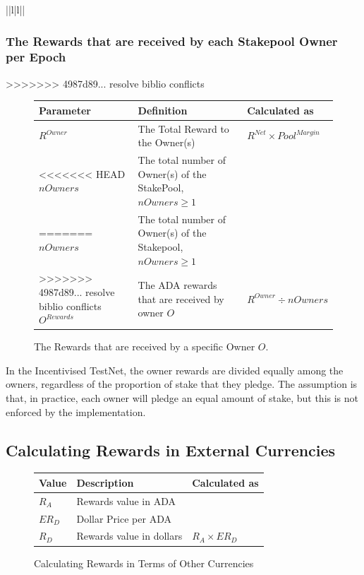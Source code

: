 \documentclass[11pt,a4paper,dvipsnames,twosided,final]{article}
\newcommand{\ada}{ADA{}}
\begin{document}
\begin{tabular}{||l|l||}
\clearpage
\subsubsection*{The Rewards that are received by each Stakepool Owner per Epoch}
>>>>>>> 4987d89... resolve biblio conflicts

\begin{figure}[h!]
\begin{center}
\begin{tabular}{||l|p{6cm}|l||}
  \hline \hline
\textbf{Parameter}  & \textbf{Definition} & \textbf{Calculated as} \\\hline
$R^\textit{Owner}$ & The Total Reward to the Owner(s) & $R^{\textit{Net}} \times {\textit{Pool}}^{\textit{Margin}} $ \\\hline
<<<<<<< HEAD
$\textit{nOwners}$ & The total number of Owner(s) of the StakePool, $\textit{nOwners} \ge 1$  & \\\hline
=======
$\textit{nOwners}$ & The total number of Owner(s) of the Stakepool, $\textit{nOwners} \ge 1$  & \\\hline
>>>>>>> 4987d89... resolve biblio conflicts
$O^{Rewards}$ & The \ada{} rewards that are received by owner $O$ & $R^\textit{Owner} \div \textit{nOwners}$ \\\hline
\hline
\end{tabular}
\end{center}
\caption{The Rewards that are received by a specific Owner $O$.}
\end{figure}

\noindent
In the Incentivised TestNet, the owner rewards are divided equally among the
owners, regardless of the proportion of stake that they pledge.  The assumption
is that, in practice, each owner will pledge an equal amount of stake, but this
is not enforced by the implementation.

\subsection{Calculating Rewards in External Currencies}
\label{sec:conversion}

\begin{figure}[h!]
\begin{center}
\begin{tabular}{||l|p{6cm}|l||}
  \hline \hline
\textbf{Value} & \textbf{Description} & \textbf{Calculated as} \\\hline
$R_A$ &  Rewards value in \ada{} &\\\hline
$ER_D$ &  Dollar Price per \ada{} &\\\hline
$R_D$ &  Rewards value in dollars & $R_A \times ER_D$ \\\hline
\hline
\end{tabular}
\end{center}
\caption{Calculating Rewards in Terms of Other Currencies}
\label{fig:monetary}
\end{figure}


\end{tabular}
\end{document}

